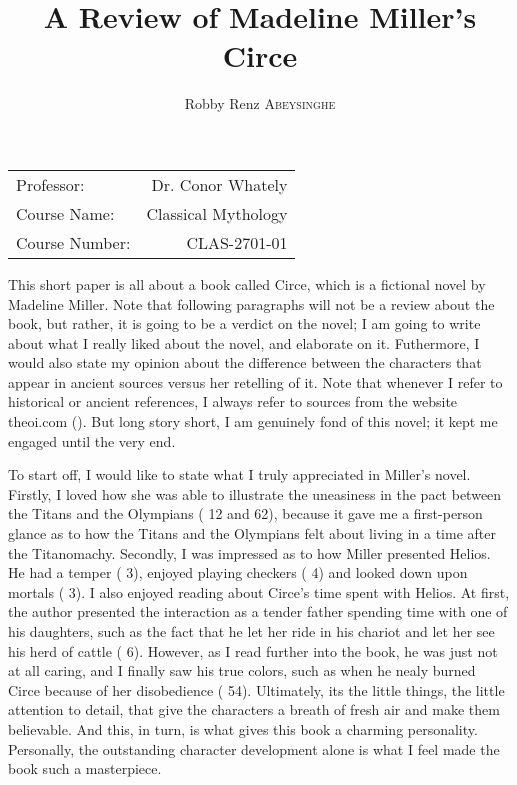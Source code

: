 \documentclass[12pt, a4paper]{article}
\author{Robby Renz \textsc{Abeysinghe}}
\title{A Review of Madeline Miller's Circe}
\begin{document}
\maketitle
\begin{center}
\begin{tabular}{l r}
Professor: & Dr. Conor Whately \\
Course Name: & Classical Mythology \\
Course Number: & CLAS-2701-01
\end{tabular}
\end{center}
\newpage

This short paper is all about a book called Circe, which is a fictional novel by Madeline Miller. Note that following paragraphs will not be a review about the book, but rather, it is going to be a verdict on the novel; I am going to write about what I really liked about the novel, and elaborate on it. Futhermore, I would also state my opinion about the difference between the characters that appear in ancient sources versus her retelling of it. Note that whenever I refer to historical or ancient references, I always refer to sources from the website theoi.com (\cite{theoi}). But long story short, I am genuinely fond of this novel; it kept me engaged until the very end. 

To start off, I would like to state what I truly appreciated in Miller's novel. Firstly, I loved how she was able to illustrate the uneasiness in the pact between the Titans and the Olympians (\cite{miller_circe_2018} 12 and 62), because it gave me a first-person glance as to how the Titans and the Olympians felt about living in a time after the Titanomachy. Secondly, I was impressed as to how Miller presented Helios. He had a temper (\cite{miller_circe_2018} 3), enjoyed playing checkers (\cite{miller_circe_2018} 4) and looked down upon mortals (\cite{miller_circe_2018} 3). I also enjoyed reading about Circe's time spent with Helios. At first, the author presented the interaction as a tender father spending time with one of his daughters, such as the fact that he let her ride in his chariot and let her see his herd of cattle (\cite{miller_circe_2018} 6). However, as I read further into the book, he was just not at all caring, and I finally saw his true colors, such as when he nealy burned Circe because of her disobedience (\cite{miller_circe_2018} 54). Ultimately, its the little things, the little attention to detail, that give the characters a breath of fresh air and make them believable. And this, in turn, is what gives this book a charming personality. Personally, the outstanding character development alone is what I feel made the book such a masterpiece.
\end{document}
